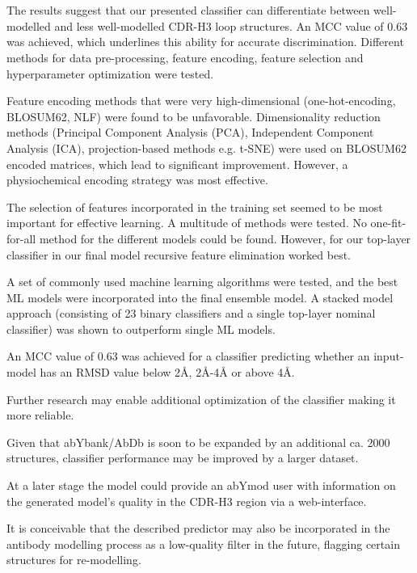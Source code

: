 \documentclass[
]{article}
\begin{document}
\hypertarget{section-1}{%
\section{}\label{section-1}}

The results suggest that our presented classifier can differentiate
between well-modelled and less well-modelled CDR-H3 loop structures. An
MCC value of 0.63 was achieved, which underlines this ability for
accurate discrimination. Different methods for data pre-processing,
feature encoding, feature selection and hyperparameter optimization were
tested.

Feature encoding methods that were very high-dimensional
(one-hot-encoding, BLOSUM62, NLF) were found to be unfavorable.
Dimensionality reduction methods (Principal Component Analysis (PCA),
Independent Component Analysis (ICA), projection-based methods e.g.
t-SNE) were used on BLOSUM62 encoded matrices, which lead to significant
improvement. However, a physiochemical encoding strategy was most
effective.

The selection of features incorporated in the training set seemed to be
most important for effective learning. A multitude of methods were
tested. No one-fit-for-all method for the different models could be
found. However, for our top-layer classifier in our final model
recursive feature elimination worked best.

A set of commonly used machine learning algorithms were tested, and the
best ML models were incorporated into the final ensemble model. A
stacked model approach (consisting of 23 binary classifiers and a single
top-layer nominal classifier) was shown to outperform single ML models.

An MCC value of 0.63 was achieved for a classifier predicting whether an
input-model has an RMSD value below 2Å, 2Å-4Å or above 4Å.

Further research may enable additional optimization of the classifier
making it more reliable.

Given that abYbank/AbDb is soon to be expanded by an additional ca. 2000
structures, classifier performance may be improved by a larger dataset.

At a later stage the model could provide an abYmod user with information
on the generated model's quality in the CDR-H3 region via a
web-interface.

It is conceivable that the described predictor may also be incorporated
in the antibody modelling process as a low-quality filter in the future,
flagging certain structures for re-modelling.
\end{document}
